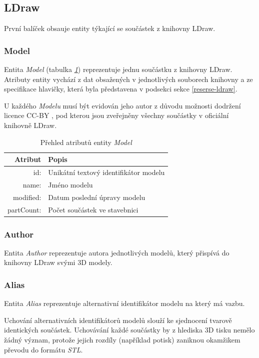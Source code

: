 \subsection{LDraw}
První balíček obsauje entity týkající se součástek z knihovny LDraw.

\subsubsection*{Model}
  Entita \textit{Model} (tabulka \emph{\ref{table:entity:model}}) reprezentuje jednu součástku z knihovny LDraw. Atributy entity vychází z dat obsažených v jednotlivých souborech knihovny a ze specifikace hlavičky, která byla představena v podsekci \emph{} sekce \ref{reserse-ldraw}.
    
  U každého \textit{Modelu} musí být evidován jeho autor z důvodu možnosti dodržení licence \gls{CC-BY} \cite{CC-BY}, pod kterou jsou zveřejněny všechny součástky v oficiální knihovně LDraw. 
  
  \begin{table}[th!]
  \centering
  \caption{Přehled atributů entity \textit{Model}}
  \label{table:entity:model}
  \begin{tabularx}{\textwidth}{@{}rX@{}}
  \toprule
  Atribut & Popis
  \\ \midrule
  id: & Unikátní textový identifikátor modelu
  \\
  name: & Jméno modelu 
  \\
  modified: & Datum poslední úpravy modelu 
  \\
  partCount: & Počet součástek ve stavebnici
  \\
  \bottomrule
  \end{tabularx}
  \end{table}

\subsubsection*{Author}
Entita \textit{Author} reprezentuje autora jednotlivých modelů, který přispívá do knihovny LDraw svými 3D modely. 
  
\subsubsection*{Alias}
Entita \textit{Alias} reprezentuje alternativní identifikátor modelu na který má vazbu. 

Uchování alternativních identifikátorů modelů slouží ke sjednocení tvarově identických součástek. Uchovávání každé součástky by z hlediska 3D tisku nemělo žádný význam, protože jejich rozdíly (například potisk) zaniknou okamžikem převodu do formátu \textit{STL}.

